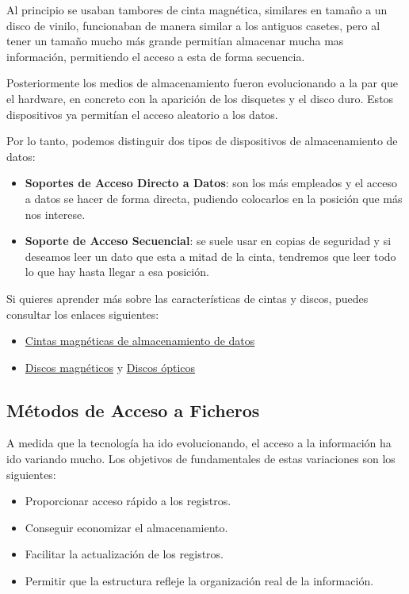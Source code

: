 Al principio se usaban tambores de cinta magnética, similares en tamaño a un disco de vinilo, funcionaban de manera similar a los antiguos casetes, pero al tener un tamaño mucho más grande permitían almacenar mucha mas información, permitiendo el acceso a esta de forma secuencia.

Posteriormente los medios de almacenamiento fueron evolucionando a la par que el hardware, en concreto con la aparición de los disquetes y el disco duro. Estos dispositivos ya permitían el acceso aleatorio a los datos.

Por lo tanto, podemos distinguir dos tipos de dispositivos de almacenamiento de datos:

\begin{itemize}
    \item \textbf{Soportes de Acceso Directo a Datos}: son los más empleados y el acceso a datos se hacer de forma directa, pudiendo colocarlos en la posición que más nos interese.
    \item \textbf{Soporte de Acceso Secuencial}: se suele usar en copias de seguridad y si deseamos leer un dato que esta a mitad de la cinta, tendremos que leer todo lo que hay hasta llegar a esa posición.
\end{itemize}

Si quieres aprender más sobre las características de cintas y discos, puedes consultar los enlaces siguientes:

\begin{itemize}
    \item \href{https://es.wikipedia.org/wiki/Cinta_magn\%C3\%A9tica_de_almacenamiento_de_datos}{Cintas magnéticas de almacenamiento de datos}
    \item \href{https://es.wikipedia.org/wiki/Disco_magn\%C3\%A9tico}{Discos magnéticos} y \href{https://es.wikipedia.org/wiki/Disco_\%C3\%B3ptico}{Discos ópticos}
\end{itemize}

\subsection{Métodos de Acceso a Ficheros}
A medida que la tecnología ha ido evolucionando, el acceso a la información ha ido variando mucho. Los objetivos de fundamentales de estas variaciones son los siguientes:

\begin{itemize}
    \item Proporcionar acceso rápido a los registros.
    \item Conseguir economizar el almacenamiento.
    \item Facilitar la actualización de los registros.
    \item Permitir que la estructura refleje la organización real de la información.
\end{itemize}

